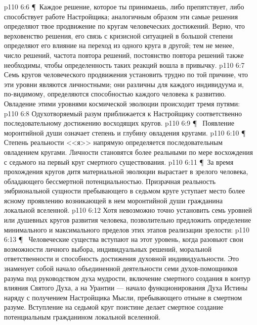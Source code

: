 \vs p110 6:6 \P\ Каждое решение, которое ты принимаешь, либо препятствует, либо способствует работе Настройщика; аналогичным образом эти самые решения определяют твое продвижение по кругам человеческих достижений. Верно, что верховенство решения, его связь с кризисной ситуацией в большой степени определяют его влияние на переход из одного круга в другой; тем не менее, число решений, частота повтора решений, постоянство повтора решений также необходимы, чтобы определенность таких реакций вошла в привычку.
\vs p110 6:7 Семь кругов человеческого продвижения установить трудно по той причине, что эти уровни являются личностными; они различны для каждого индивидуума и, по\hyp{}видимому, определяются способностью каждого человека к развитию. Овладение этими уровнями космической эволюции происходит тремя путями:
\vs p110 6:8 \bibnobreakspace {} Одухотворяемый разум приближается к Настройщику соответственно последовательному достижению восходящих кругов.
\vs p110 6:9 \P\ \bibnobreakspace {} Появление моронтийной души означает степень и глубину овладения кругами.
\vs p110 6:10 \P\ \bibnobreakspace {} Степень реальности <<я>> напрямую определяется последовательным овладением кругами. Личности становятся более реальными по мере восхождения с седьмого на первый круг смертного существования.
\vs p110 6:11 \P\ За время прохождения кругов дитя материальной эволюции вырастает в зрелого человека, обладающего бессмертной потенциальностью. Призрачная реальность эмбриональной сущности пребывающего в седьмом круге уступает место более ясному проявлению возникающей в нем моронтийной души гражданина локальной вселенной.
\vs p110 6:12 Хотя невозможно точно установить семь уровней или душевных кругов развития человека, позволительно предложить определение минимального и максимального пределов этих этапов реализации зрелости:
\vs p110 6:13 \P\  Человеческие существа вступают на этот уровень, когда разовьют свои возможности личного выбора, индивидуальных решений, моральной ответственности и способность достижения духовной индивидуальности. Это знаменует собой начало объединенной деятельности семи духов\hyp{}помощников разума под руководством духа мудрости, включение смертного создания в контур влияния Святого Духа, а на Урантии --- начало функционирования Духа Истины наряду с получением Настройщика Мысли, пребывающего отныне в смертном разуме. Вступление на седьмой круг поистине делает смертное создание потенциальным гражданином локальной вселенной.
